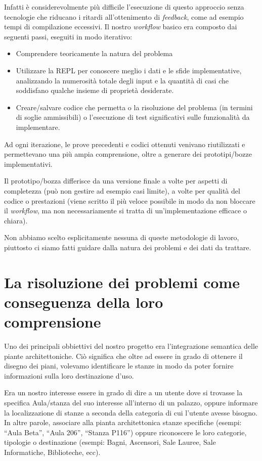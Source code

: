 \documentclass[12pt]{report}
\begin{document}
Infatti è considerevolmente più difficile l'esecuzione di questo approccio
senza tecnologie che riducano i ritardi all'ottenimento
di \textit{feedback}, come ad esempio tempi di compilazione eccessivi.
Il nostro \textit{workflow} basico era composto dai seguenti passi,
eseguiti in modo iterativo:

\begin{itemize}
	\item Comprendere teoricamente la natura del problema
	\item Utilizzare la REPL per conoscere meglio i dati e le sfide
implementative, analizzando la numerosità totale degli input e la
quantità di casi che soddisfano qualche insieme di proprietà desiderate.
	\item Creare/salvare codice che permetta o la risoluzione del
problema (in termini di soglie ammissibili) o l'esecuzione di test
significativi sulle funzionalità da implementare.
\end{itemize}

Ad ogni iterazione, le prove precedenti e codici ottenuti venivano
riutilizzati e permettevano una più ampia comprensione, oltre a
generare dei prototipi/bozze implementativi.

Il prototipo/bozza differisce da una versione finale a volte per
aspetti di completezza (può non gestire ad esempio casi limite), a
volte per qualità del codice o prestazioni (viene scritto il più
veloce possibile in modo da non bloccare il \textit{workflow}, ma non
necessariamente si tratta di un'implementazione efficace o chiara).

Non abbiamo scelto esplicitamente nessuna di queste metodologie di
lavoro, piuttosto ci siamo fatti guidare dalla natura dei problemi e
dei dati da trattare. 

\section{La risoluzione dei problemi come conseguenza della loro comprensione}

Uno dei principali obbiettivi del nostro progetto era l'integrazione
semantica delle piante architettoniche. Ciò significa che oltre ad
essere in grado di ottenere il disegno dei piani, volevamo
identificare le stanze in modo da poter fornire informazioni sulla loro
destinazione d'uso. 

Era un nostro interesse essere in grado di dire a un utente
dove si trovasse la specifica Aula/stanza del suo interesse all'interno
di un palazzo, oppure informare la localizzazione di stanze a seconda
della categoria di cui l'utente avesse bisogno. In altre parole, 
associare alla pianta architettonica
stanze specifiche (esempi: ``Aula Beta'', ``Aula 206'', ``Stanza P116'')
oppure riconoscere le loro categorie, tipologie o 
destinazione (esempi: Bagni, Ascensori, Sale Lauree, Sale Informatiche,
Biblioteche, ecc).
\end{document}
